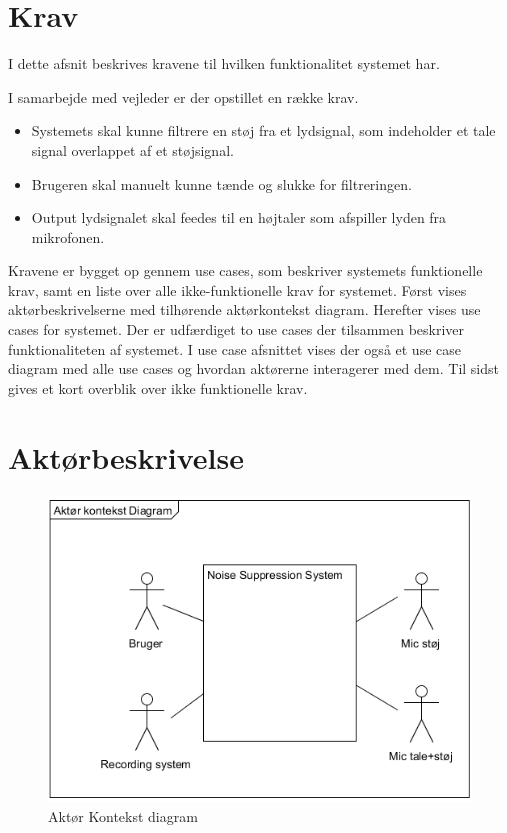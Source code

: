\graphicspath{{Chapters/Krav/}}


\section{Krav}
I dette afsnit beskrives kravene til hvilken funktionalitet systemet har. 


I samarbejde med vejleder er der opstillet en række krav.
\begin{itemize}
\item Systemets skal kunne filtrere en støj fra et lydsignal, som indeholder et tale signal overlappet af et støjsignal.
\item Brugeren skal manuelt kunne tænde og slukke for filtreringen.
\item Output lydsignalet skal feedes til en højtaler som afspiller lyden fra mikrofonen. 
\end{itemize}

Kravene er bygget op gennem use cases, som beskriver systemets funktionelle krav, samt en liste over alle ikke-funktionelle krav for systemet. Først vises aktørbeskrivelserne
med tilhørende aktørkontekst diagram. Herefter vises use cases for systemet. Der er udfærdiget to use cases
der tilsammen beskriver funktionaliteten af systemet. I use case afsnittet vises der også et use case diagram
med alle use cases og hvordan aktørerne interagerer med dem. Til sidst gives et kort overblik over ikke funktionelle krav.

\section{Aktørbeskrivelse}

\begin{figure}[H]
	\centering
	\includegraphics[width = 200 pt]{Img/Aktoer_Kontekst.png}
	\caption{Aktør Kontekst diagram}
	\label{fig:Aktoer Kontekst diagram}
\end{figure}

